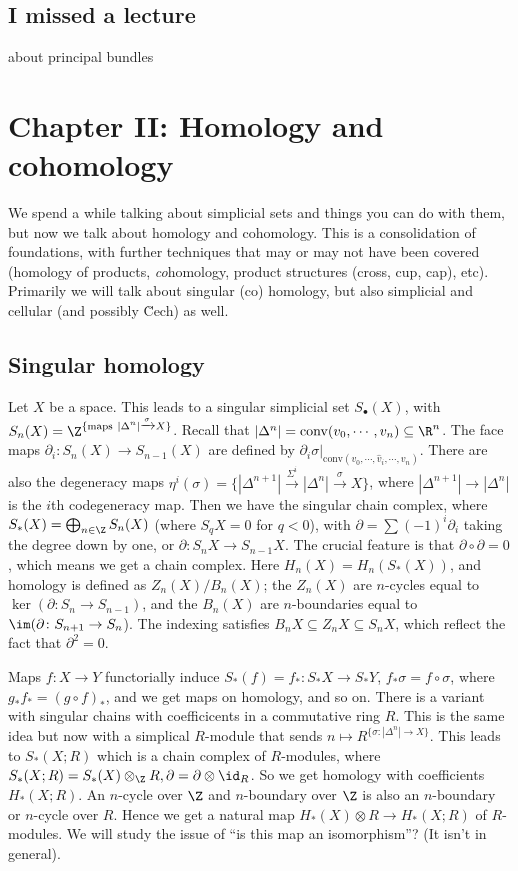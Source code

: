 \subsection{I missed a lecture}
about principal bundles
\section{Chapter II: Homology and cohomology} 
We spend a while talking about simplicial sets and things you can do with them, but now we talk about homology and cohomology. This is a consolidation of foundations, with further techniques that may or may not have been covered (homology of products, \emph{co}homology, product structures (cross, cup, cap), etc). Primarily we will talk about singular (co) homology, but also simplicial and cellular (and possibly \u Cech) as well.
\subsection{Singular homology}
Let $X$ be a space. This leads to a singular simplicial set $S_{\bullet}(X)$, with $S_n (X)=\Z^{\{\text{maps} \ |\Delta ^n | \xrightarrow{\sigma}  X\} }$. Recall that $|\Delta ^n |=\mathrm{conv}(v_0, \cdots ,v_n ) \subseteq \R^n $. The face maps $\partial _i \colon S_n (X) \to S_{n-1}(X)$ are defined by $\left. \partial _i \sigma \right| _{\mathrm{conv}(v_0, \cdots , \hat{v}_i , \cdots ,v_n )}$. There are also the degeneracy maps $\eta ^i  (\sigma)= \{|\Delta ^{n+1} | \xrightarrow{\Sigma^i }  |\Delta ^n |\xrightarrow{\sigma}X\}  $, where $|\Delta ^{n+1}| \to |\Delta ^n |$ is the $i$th codegeneracy map. Then we have the singular chain complex, where $S_*(X) =\bigoplus _{n \in \Z}S_n (X)$ (where $S_qX=0$ for $q<0 $), with $\partial =\sum (-1)^i  \partial _i $ taking the degree down by one, or $\partial  \colon S_n X \to S_{n-1}X$. The crucial feature is that $\partial \circ \partial =0$, which means we get a chain complex. Here $H_n (X)=H_n (S_*(X))$, and homology is defined as $Z_n (X) /B_n (X)$; the $Z_n (X)$ are $n$-cycles equal to $\ker(\partial  \colon S_n  \to S_{n-1}) $, and the $B_n (X)$ are $n$-boundaries equal to $\im (\partial  \colon S_{n+1} \to S_n $).
    The indexing satisfies $B_nX \subseteq Z_n X \subseteq S_n X$, which reflect the fact that $\partial ^2=0$.

    Maps $f \colon X \to Y$ functorially induce $S_*(f)=f_* \colon S_*X \to S_*Y$, $f_* \sigma=f \circ \sigma$, where $g_*f_*=(g \circ f)_*$, and we get maps on homology, and so on. There is a variant with singular chains with coefficicents in a  commutative ring $R$. This is the same idea but now with a simplical  $R$-module that sends $n \mapsto  R ^{\{\sigma \colon |\Delta ^n | \to X\} }$. This leads to $S_*(X;R)$ which is a chain complex of $R$-modules, where $S_*(X;R)=S_*(X) \otimes_{\Z}R, \partial =\partial \otimes \id_R$. So we get homology with coefficients $H_*(X;R)$.
    An $n$-cycle over $\Z$ and $n$-boundary over $\Z$ is also an $n$-boundary or $n$-cycle over $R$. Hence we get a natural map $H_*(X)\otimes R \to H_*(X;R)$ of $R$-modules. We will study the issue of ``is this map an isomorphism''? (It isn't in general).

